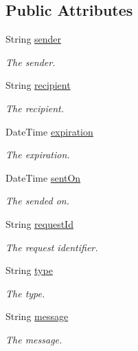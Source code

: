 \subsection*{Public Attributes}
\begin{DoxyCompactItemize}
\item 
String \hyperlink{classcom_1_1shephertz_1_1app42_1_1paas_1_1sdk_1_1csharp_1_1gift_1_1_gift_1_1_requests_a6e273754237e4faa7637d9de156d1579}{sender}
\begin{DoxyCompactList}\small\item\em The sender. \end{DoxyCompactList}\item 
String \hyperlink{classcom_1_1shephertz_1_1app42_1_1paas_1_1sdk_1_1csharp_1_1gift_1_1_gift_1_1_requests_a25855b41102f7107b60afd1a86b1f146}{recipient}
\begin{DoxyCompactList}\small\item\em The recipient. \end{DoxyCompactList}\item 
Date\+Time \hyperlink{classcom_1_1shephertz_1_1app42_1_1paas_1_1sdk_1_1csharp_1_1gift_1_1_gift_1_1_requests_afc0258103b38d39c4b5a5f665e658483}{expiration}
\begin{DoxyCompactList}\small\item\em The expiration. \end{DoxyCompactList}\item 
Date\+Time \hyperlink{classcom_1_1shephertz_1_1app42_1_1paas_1_1sdk_1_1csharp_1_1gift_1_1_gift_1_1_requests_af83b9120dade63595d80daa388219019}{sent\+On}
\begin{DoxyCompactList}\small\item\em The sended on. \end{DoxyCompactList}\item 
String \hyperlink{classcom_1_1shephertz_1_1app42_1_1paas_1_1sdk_1_1csharp_1_1gift_1_1_gift_1_1_requests_a6ac937d0587a246d08cef78a4b696543}{request\+Id}
\begin{DoxyCompactList}\small\item\em The request identifier. \end{DoxyCompactList}\item 
String \hyperlink{classcom_1_1shephertz_1_1app42_1_1paas_1_1sdk_1_1csharp_1_1gift_1_1_gift_1_1_requests_ade1faf3921afa255a58884cd417a87b6}{type}
\begin{DoxyCompactList}\small\item\em The type. \end{DoxyCompactList}\item 
String \hyperlink{classcom_1_1shephertz_1_1app42_1_1paas_1_1sdk_1_1csharp_1_1gift_1_1_gift_1_1_requests_aa52776a1944cad2689332665351cc3d6}{message}
\begin{DoxyCompactList}\small\item\em The message. \end{DoxyCompactList}\end{DoxyCompactItemize}


